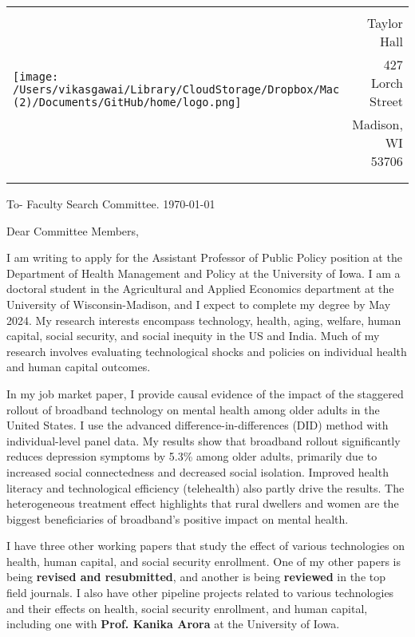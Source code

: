 \documentclass[12pt]{letter}
\begin{document}
\begin{tabularx}{\textwidth}{Xr}
\multirow{4}{*}{\texttt{[image: /Users/vikasgawai/Library/CloudStorage/Dropbox/Mac (2)/Documents/GitHub/home/logo.png]}} &  \\
& Taylor Hall \\
& 427 Lorch Street \\
& Madison, WI 53706 \\
[-1.8ex]\\
\\
\end{tabularx}

To- Faculty Search Committee. \hfill \today 
\medskip

Dear Committee Members,

I am writing to apply for the Assistant Professor of Public Policy position at the Department of Health Management and Policy at the University of Iowa. I am a doctoral student in the Agricultural and Applied Economics department at the University of Wisconsin-Madison, and I expect to complete my degree by May 2024. My research interests encompass technology, health, aging, welfare, human capital, social security, and social inequity in the US and India. Much of my research involves evaluating technological shocks and policies on individual health and human capital outcomes.

In my job market paper, I provide causal evidence of the impact of the staggered rollout of broadband technology on mental health among older adults in the United States. I use the advanced difference-in-differences (DID) method with individual-level panel data. My results show that broadband rollout significantly reduces depression symptoms by 5.3\% among older adults, primarily due to increased social connectedness and decreased social isolation. Improved health literacy and technological efficiency (telehealth) also partly drive the results. The heterogeneous treatment effect highlights that rural dwellers and women are the biggest beneficiaries of broadband’s positive impact on mental health.

I have three other working papers that study the effect of various technologies on health, human capital, and social security enrollment. One of my other papers is being \textbf{revised and resubmitted}, and another is being  \textbf{reviewed} in the top field journals. I also have other pipeline projects related to various technologies and their effects on health, social security enrollment, and human capital, including one with \textbf{Prof. Kanika Arora} at the University of Iowa.
\end{document}
